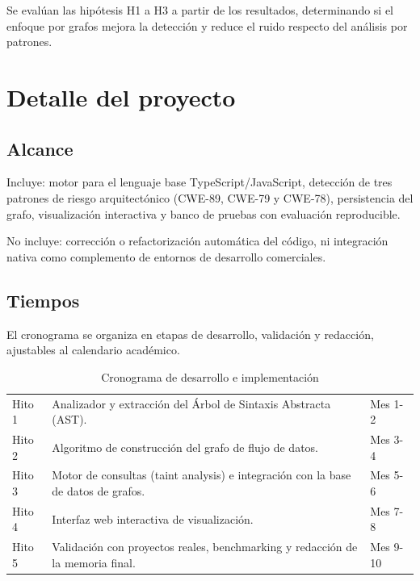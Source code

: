 Se evalúan las hipótesis H1 a H3 a partir de los resultados, determinando si el enfoque por grafos mejora la detección y reduce el ruido respecto del análisis por patrones.

\section{Detalle del proyecto}\label{sec:n2.4}

\subsection{Alcance}\label{sec:n2.4.1}

Incluye: motor para el lenguaje base TypeScript/JavaScript, detección de tres patrones de riesgo arquitectónico (CWE-89, CWE-79 y CWE-78), persistencia del grafo, visualización interactiva y banco de pruebas con evaluación reproducible.

No incluye: corrección o refactorización automática del código, ni integración nativa como complemento de entornos de desarrollo comerciales.

\subsection{Tiempos}\label{sec:n2.4.2}

El cronograma se organiza en etapas de desarrollo, validación y redacción, ajustables al calendario académico.

\begin{table}[H]
    \centering
    \caption{Cronograma de desarrollo e implementación}
    \label{tab:hitos}
    \small
    \begin{tabularx}{\textwidth}{l L l}
        \toprule
         &  &  \\
        \midrule
        Hito 1 & Analizador y extracción del Árbol de Sintaxis Abstracta (AST). & Mes 1-2 \\
        Hito 2 & Algoritmo de construcción del grafo de flujo de datos. & Mes 3-4 \\
        Hito 3 & Motor de consultas (taint analysis) e integración con la base de datos de grafos. & Mes 5-6 \\
        Hito 4 & Interfaz web interactiva de visualización. & Mes 7-8 \\
        Hito 5 & Validación con proyectos reales, benchmarking y redacción de la memoria final. & Mes 9-10 \\
        \bottomrule
    \end{tabularx}
\end{table}

